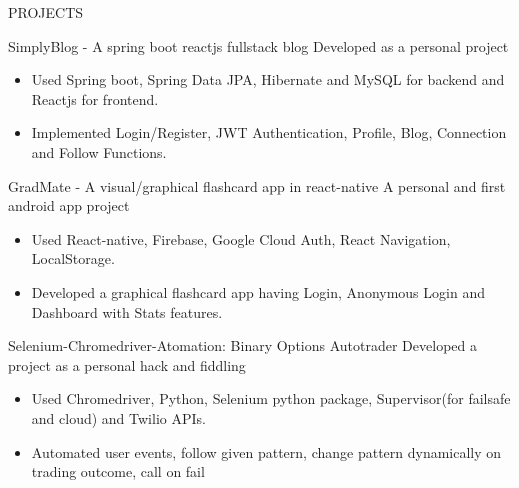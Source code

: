 \documentclass{resume} %
\begin{document}

\begin{rSection}{PROJECTS}

\begin{rSubsection}{SimplyBlog - A spring boot reactjs fullstack blog}{\sl %
}{Developed as a personal project}{}
\begin{itemize}[noitemsep, label=\small\textbullet]
    \item Used Spring boot, Spring Data JPA, Hibernate and MySQL for backend and Reactjs for frontend.
    \item Implemented Login/Register, JWT Authentication, Profile, Blog, Connection and Follow Functions.
\end{itemize}
\end{rSubsection}  


\begin{rSubsection}{GradMate - A visual/graphical flashcard app in react-native}{\sl %
}{A personal and first android app project}{}
\begin{itemize}[noitemsep,label=\small\textbullet]
\item Used React-native, Firebase, Google Cloud Auth, React Navigation, LocalStorage.
\item Developed a graphical flashcard app having Login, Anonymous Login and Dashboard with Stats features.
\end{itemize}
\end{rSubsection}

\begin{rSubsection}{Selenium-Chromedriver-Atomation: Binary Options Autotrader}{\sl %
}{Developed a project as a personal hack and fiddling}{}
\begin{itemize}[noitemsep,label=\small\textbullet]
\item Used Chromedriver, Python, Selenium python package, Supervisor(for failsafe and cloud) and Twilio APIs.
\item Automated user events, follow given pattern, change pattern dynamically on trading outcome, call on fail
\end{itemize}
\end{rSubsection}


\end{rSection} 
\end{document}
